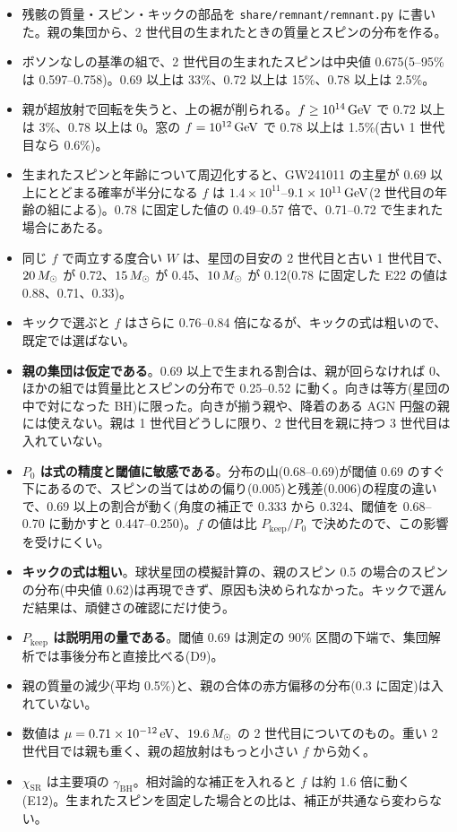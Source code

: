 \begin{result}
\begin{itemize}
\item 残骸の質量・スピン・キックの部品を \texttt{share/remnant/remnant.py} に書いた。親の集団から、2 世代目の生まれたときの質量とスピンの分布を作る。
\item ボソンなしの基準の組で、2 世代目の生まれたスピンは中央値 0.675(5--95\% は 0.597--0.758)。0.69 以上は 33\%、0.72 以上は 15\%、0.78 以上は 2.5\%。
\item 親が超放射で回転を失うと、上の裾が削られる。$f\ge10^{14}\,\mathrm{GeV}$ で 0.72 以上は 3\%、0.78 以上は 0。窓の $f=10^{12}\,\mathrm{GeV}$ で 0.78 以上は 1.5\%(古い 1 世代目なら 0.6\%)。
\item 生まれたスピンと年齢について周辺化すると、GW241011 の主星が 0.69 以上にとどまる確率が半分になる $f$ は $1.4\times10^{11}$--$9.1\times10^{11}\,\mathrm{GeV}$(2 世代目の年齢の組による)。0.78 に固定した値の 0.49--0.57 倍で、0.71--0.72 で生まれた場合にあたる。
\item 同じ $f$ で両立する度合い $W$ は、星団の目安の 2 世代目と古い 1 世代目で、$20\,M_\odot$ が 0.72、$15\,M_\odot$ が 0.45、$10\,M_\odot$ が 0.12(0.78 に固定した E22 の値は 0.88、0.71、0.33)。
\item キックで選ぶと $f$ はさらに 0.76--0.84 倍になるが、キックの式は粗いので、既定では選ばない。
\end{itemize}
\end{result}

\begin{caveat}
\begin{itemize}
\item \textbf{親の集団は仮定である}。0.69 以上で生まれる割合は、親が回らなければ 0、ほかの組では質量比とスピンの分布で 0.25--0.52 に動く。向きは等方(星団の中で対になった BH)に限った。向きが揃う親や、降着のある AGN 円盤の親には使えない。親は 1 世代目どうしに限り、2 世代目を親に持つ 3 世代目は入れていない。
\item \textbf{$P_0$ は式の精度と閾値に敏感である}。分布の山(0.68--0.69)が閾値 0.69 のすぐ下にあるので、スピンの当てはめの偏り(0.005)と残差(0.006)の程度の違いで、0.69 以上の割合が動く(角度の補正で 0.333 から 0.324、閾値を 0.68--0.70 に動かすと 0.447--0.250)。$f$ の値は比 $P_\mathrm{keep}/P_0$ で決めたので、この影響を受けにくい。
\item \textbf{キックの式は粗い}。球状星団の模擬計算の、親のスピン 0.5 の場合のスピンの分布(中央値 0.62)は再現できず、原因も決められなかった。キックで選んだ結果は、頑健さの確認にだけ使う。
\item \textbf{$P_\mathrm{keep}$ は説明用の量である}。閾値 0.69 は測定の 90\% 区間の下端で、集団解析では事後分布と直接比べる(D9)。
\item 親の質量の減少(平均 0.5\%)と、親の合体の赤方偏移の分布(0.3 に固定)は入れていない。
\item 数値は $\mu=0.71\times10^{-12}\,\mathrm{eV}$、$19.6\,M_\odot$ の 2 世代目についてのもの。重い 2 世代目では親も重く、親の超放射はもっと小さい $f$ から効く。
\item $\chi_\mathrm{SR}$ は主要項の $\gamma_\mathrm{BH}$。相対論的な補正を入れると $f$ は約 1.6 倍に動く(E12)。生まれたスピンを固定した場合との比は、補正が共通なら変わらない。
\end{itemize}
\end{caveat}
